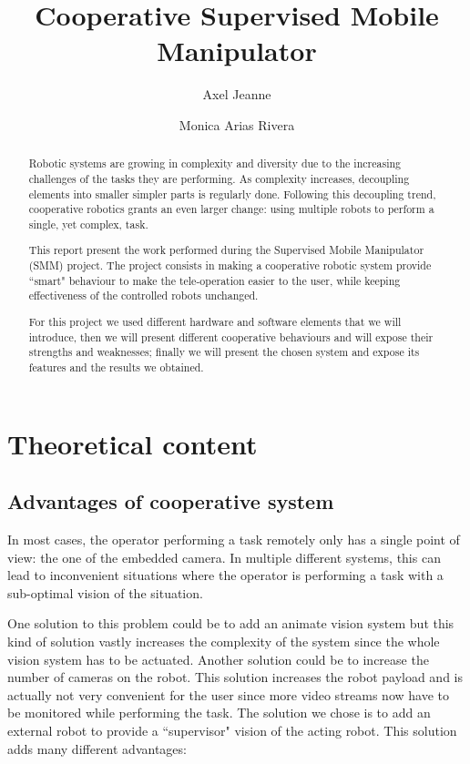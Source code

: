 \documentclass[11pt,a4paper]{article}
\begin{document}
\pagestyle{headings}
\author{Axel Jeanne \and Monica Arias Rivera}
\title{Cooperative Supervised Mobile Manipulator}
\maketitle
\begin{abstract}
Robotic systems are growing in complexity and diversity due to the increasing challenges of the tasks
they are performing. As complexity increases, decoupling elements into smaller simpler parts is
regularly done. Following this decoupling trend, cooperative robotics grants an even 
larger change: using multiple robots to perform a single, yet complex, task.

This report present the work performed during the Supervised Mobile Manipulator (SMM) project.
The project consists in making a cooperative robotic system provide ``smart" behaviour to
make the tele-operation easier to the user, while keeping effectiveness of the controlled robots 
unchanged.

For this project we used different hardware and software elements that we will introduce,
then we will present different cooperative behaviours and will expose their strengths and weaknesses; finally we will present the chosen system and expose its features and the results we obtained.
\end{abstract}
\clearpage

\tableofcontents

\clearpage
\section{Theoretical content}
\subsection{Advantages of cooperative system}
In most cases, the operator performing a task remotely only has a single point of view: the
one of the embedded camera. In multiple different systems, this can
lead to inconvenient situations where the operator is performing a task with a sub-optimal
vision of the situation.

One solution to this problem could be to add an animate vision system \cite{Ballard1991}
but this kind of solution vastly increases the complexity of the system since the whole vision system
has to be actuated. Another solution could be to increase the number of cameras on the robot.
This solution increases the robot payload and is actually not very convenient for the user
since more video streams now have to be monitored while performing the task. The solution we chose is to add an external robot to provide a ``supervisor" vision of the acting robot. This solution adds many different  advantages:
\end{document}
